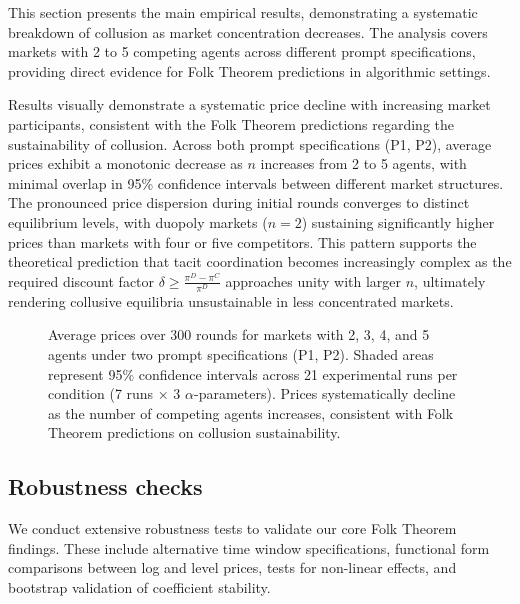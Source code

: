 This section presents the main empirical results, demonstrating a systematic breakdown of collusion as market concentration decreases. The analysis covers markets with 2 to 5 competing agents across different prompt specifications, providing direct evidence for Folk Theorem predictions in algorithmic settings.

Results visually demonstrate a systematic price decline with increasing market participants, consistent with the Folk Theorem predictions regarding the sustainability of collusion. Across both prompt specifications (P1, P2), average prices exhibit a monotonic decrease as $n$ increases from 2 to 5 agents, with minimal overlap in 95\% confidence intervals between different market structures. The pronounced price dispersion during initial rounds converges to distinct equilibrium levels, with duopoly markets ($n=2$) sustaining significantly higher prices than markets with four or five competitors. This pattern supports the theoretical prediction that tacit coordination becomes increasingly complex as the required discount factor $\delta \geq \frac{\pi^D - \pi^C}{\pi^D}$ approaches unity with larger $n$, ultimately rendering collusive equilibria unsustainable in less concentrated markets.

\begin{figure}[H]
    \centering
    
    \caption{Average prices over 300 rounds for markets with 2, 3, 4, and 5 agents under two prompt specifications (P1, P2). Shaded areas represent 95\% confidence intervals across 21 experimental runs per condition (7 runs × 3 $\alpha$-parameters). Prices systematically decline as the number of competing agents increases, consistent with Folk Theorem predictions on collusion sustainability.}
    \label{fig:ts_prices_comb}
\end{figure}


\subsection*{Robustness checks}\label{app:robust}

We conduct extensive robustness tests to validate our core Folk Theorem findings. These include alternative time window specifications, functional form comparisons between log and level prices, tests for non-linear effects, and bootstrap validation of coefficient stability.

